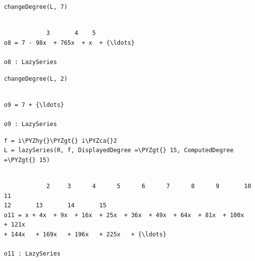 \documentclass[11pt]{article}
\makeatletter
\def\PYZca{\char`\^}
\def\PYZgt{\char`\>}
\def\PYZhy{\char`\-}
\newcommand{\boxspacing}{\kern\kvtcb@left@rule\kern\kvtcb@boxsep}
\newcommand{\prompt}[4]{
        {\ttfamily\llap{{\color{#2}[#3]:\hspace{3pt}#4}}\vspace{-\baselineskip}}
    }
\makeatother
\begin{document}
    \begin{tcolorbox}[breakable, size=fbox, boxrule=1pt, pad at break*=1mm,colback=cellbackground, colframe=cellborder]
\prompt{In}{incolor}{8}{\boxspacing}
\begin{Verbatim}[commandchars=\\\{\}]
changeDegree(L, 7)
\end{Verbatim}
\end{tcolorbox}

    \begin{Verbatim}[commandchars=\\\{\}]

            3       4    5
o8 = 7 - 98x  + 765x  + x  + {\ldots}

o8 : LazySeries
    \end{Verbatim}

    \begin{tcolorbox}[breakable, size=fbox, boxrule=1pt, pad at break*=1mm,colback=cellbackground, colframe=cellborder]
\prompt{In}{incolor}{9}{\boxspacing}
\begin{Verbatim}[commandchars=\\\{\}]
changeDegree(L, 2)
\end{Verbatim}
\end{tcolorbox}

    \begin{Verbatim}[commandchars=\\\{\}]

o9 = 7 + {\ldots}

o9 : LazySeries
    \end{Verbatim}

    \begin{tcolorbox}[breakable, size=fbox, boxrule=1pt, pad at break*=1mm,colback=cellbackground, colframe=cellborder]
\prompt{In}{incolor}{11}{\boxspacing}
\begin{Verbatim}[commandchars=\\\{\}]
f = i\PYZhy{}\PYZgt{} i\PYZca{}2
L = lazySeries(R, f, DisplayedDegree =\PYZgt{} 15, ComputedDegree =\PYZgt{} 15)
\end{Verbatim}
\end{tcolorbox}

    \begin{Verbatim}[commandchars=\\\{\}]

            2     3      4      5      6      7      8      9       10       11
12       13       14       15
o11 = x + 4x  + 9x  + 16x  + 25x  + 36x  + 49x  + 64x  + 81x  + 100x   + 121x
+ 144x   + 169x   + 196x   + 225x   + {\ldots}

o11 : LazySeries
    \end{Verbatim}
\end{document}
